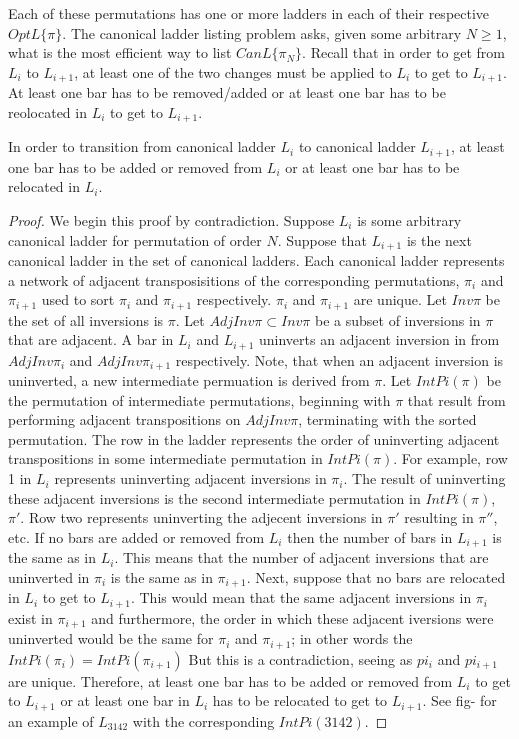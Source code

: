 Each of these permutations has one or more ladders in each of their respective 
$OptL\{\pi\}$. The canonical ladder listing  problem asks, given some arbitrary $N \geq 1$,
what is the most efficient way to list $CanL\{\pi_{N}\}$. Recall that in order to get from $L_{i}$ to $L_{i+1}$, at least one of the 
two changes must be applied to $L_{i}$ to get to $L_{i+1}$. At least one bar has to be removed/added or at least one bar 
has to be reolocated in $L_{i}$ to get to $L_{i+1}$.

\begin{theorem}
    In order to transition from canonical ladder $L_{i}$ to canonical ladder $L_{i+1}$, at least one bar has to be added or 
    removed from $L_{i}$ or at least one bar has to be relocated in $L_{i}$.
\end{theorem}
\begin{proof}
    We begin this proof by contradiction. Suppose $L_{i}$ is some arbitrary canonical ladder for permutation of 
    order $N$. Suppose that $L_{i+1}$ is the next canonical ladder in the set of canonical ladders. Each canonical 
    ladder represents a network of adjacent transposisitions of the corresponding permutations, $\pi_{i}$ and 
    $\pi_{i+1}$ used to sort $\pi_{i}$ and $\pi_{i+1}$ respectively. $\pi_{i}$ and $\pi_{i+1}$ are unique. Let $Inv{\pi}$ 
    be the set of all inversions is $\pi$. Let $AdjInv{\pi} \subset Inv{\pi}$ be a subset of inversions in $\pi$
    that are adjacent. A bar in $L_{i}$ and $L_{i+1}$ uninverts an adjacent inversion in from $AdjInv{\pi_{i}}$ and $AdjInv{\pi_{i+1}}$ respectively. 
    Note, that when an adjacent inversion is uninverted, a new intermediate permuation is derived from $\pi$. Let $IntPi(\pi)$
    be the permutation of intermediate permutations, beginning with $\pi$ that result from performing adjacent transpositions on $AdjInv{\pi}$, terminating with 
    the sorted permutation. The row in the ladder represents the order of uninverting adjacent transpositions in some intermediate permutation in $IntPi(\pi)$.
    For example, row 1 in $L_{i}$ represents uninverting adjacent inversions in $\pi_{i}$. The result of uninverting these 
    adjacent inversions is the second intermediate permutation in $IntPi(\pi)$, $\pi'$. Row two represents uninverting the adjecent 
    inversions in $\pi'$ resulting in $\pi''$, etc. If no bars are added or removed from $L_{i}$ then 
    the number of bars in $L_{i+1}$ is the same as in $L_{i}$. This means that the number of adjacent inversions that are uninverted 
    in $\pi_{i}$ is the same as in $\pi_{i+1}$. Next, suppose that no bars are relocated in $L_{i}$ to get to $L_{i+1}$. This would 
    mean that the same adjacent inversions in $\pi_{i}$ exist in $\pi_{i+1}$ and furthermore, the order in which these adjacent 
    iversions were uninverted would be the same for $\pi_{i}$ and $\pi_{i+1}$; in other words the $IntPi(\pi_{i})=IntPi(\pi_{i+1})$ But this is a contradiction, 
    seeing as $pi_{i}$ and $pi_{i+1}$ are unique. Therefore, at least one 
    bar has to be added or removed from $L_{i}$ to get to $L_{i+1}$ or at least one bar in $L_{i}$ has to be relocated to get to $L_{i+1}$.
    See fig- for an example of $L_{3 1 4 2}$ with the corresponding $IntPi(3 1 4 2)$.
\end{proof}

